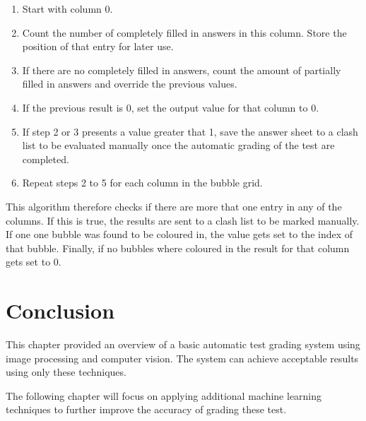 \begin{enumerate}
\item Start with column 0.
\item Count the number of completely filled in answers in this column. Store the position of that entry for later use.
\item If there are no completely filled in answers, count the amount of partially filled in answers and override the previous values.
\item If the previous result is 0, set the output value for that column to 0.
\item If step 2 or 3 presents a value greater that 1, save the answer sheet to a clash list to be evaluated manually once the automatic grading of the test are completed.
\item Repeat steps 2 to 5 for each column in the bubble grid.
\end{enumerate}

This algorithm therefore checks if there are more that one entry in any of the columns. If this is true, the results are sent to a clash list to be marked manually. If one one bubble was found to be coloured in, the value gets set to the index of that bubble. Finally, if no bubbles where coloured in the result for that column gets set to 0.

\section{Conclusion}

This chapter provided an overview of a basic automatic test grading system using image processing and computer vision. The system can achieve acceptable results using only these techniques.

The following chapter will focus on applying additional machine learning techniques to further improve the accuracy of grading these test.